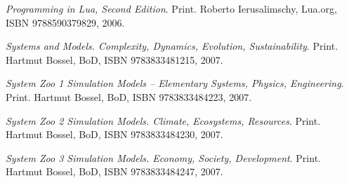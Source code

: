 \item
{\it Programming in Lua, Second Edition}. Print.\crlf
Roberto Ierusalimschy, Lua.org, ISBN 9788590379829, 2006.

\item
{\it Systems and Models. Complexity, Dynamics, Evolution, Sustainability}. Print.\crlf
Hartmut Bossel, BoD, ISBN 9783833481215, 2007.

\item
{\it System Zoo 1 Simulation Models -- Elementary Systems, Physics, Engineering}. Print.\crlf
Hartmut Bossel, BoD, ISBN 9783833484223, 2007.

\item
{\it System Zoo 2 Simulation Models. Climate, Ecosystems, Resources}. Print.\crlf
Hartmut Bossel, BoD, ISBN 9783833484230, 2007.

\item
{\it System Zoo 3 Simulation Models. Economy, Society, Development}. Print.\crlf
Hartmut Bossel, BoD, ISBN 9783833484247, 2007.
\stopitemize

